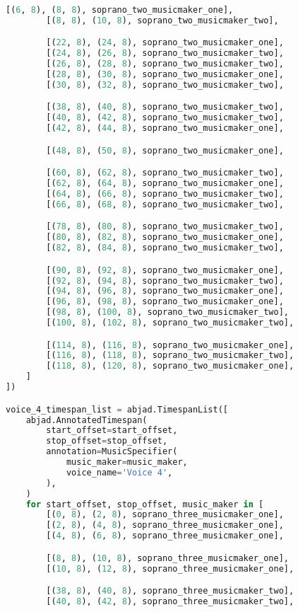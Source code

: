 \begin{lstlisting}[language=Python, caption=Invocation Source Code]
        [(6, 8), (8, 8), soprano_two_musicmaker_one],
        [(8, 8), (10, 8), soprano_two_musicmaker_two],

        [(22, 8), (24, 8), soprano_two_musicmaker_one],
        [(24, 8), (26, 8), soprano_two_musicmaker_two],
        [(26, 8), (28, 8), soprano_two_musicmaker_two],
        [(28, 8), (30, 8), soprano_two_musicmaker_one],
        [(30, 8), (32, 8), soprano_two_musicmaker_two],

        [(38, 8), (40, 8), soprano_two_musicmaker_two],
        [(40, 8), (42, 8), soprano_two_musicmaker_two],
        [(42, 8), (44, 8), soprano_two_musicmaker_one],

        [(48, 8), (50, 8), soprano_two_musicmaker_one],

        [(60, 8), (62, 8), soprano_two_musicmaker_two],
        [(62, 8), (64, 8), soprano_two_musicmaker_one],
        [(64, 8), (66, 8), soprano_two_musicmaker_two],
        [(66, 8), (68, 8), soprano_two_musicmaker_two],

        [(78, 8), (80, 8), soprano_two_musicmaker_two],
        [(80, 8), (82, 8), soprano_two_musicmaker_one],
        [(82, 8), (84, 8), soprano_two_musicmaker_two],

        [(90, 8), (92, 8), soprano_two_musicmaker_one],
        [(92, 8), (94, 8), soprano_two_musicmaker_two],
        [(94, 8), (96, 8), soprano_two_musicmaker_one],
        [(96, 8), (98, 8), soprano_two_musicmaker_one],
        [(98, 8), (100, 8), soprano_two_musicmaker_two],
        [(100, 8), (102, 8), soprano_two_musicmaker_two],

        [(114, 8), (116, 8), soprano_two_musicmaker_one],
        [(116, 8), (118, 8), soprano_two_musicmaker_two],
        [(118, 8), (120, 8), soprano_two_musicmaker_one],
    ]
])

voice_4_timespan_list = abjad.TimespanList([
    abjad.AnnotatedTimespan(
        start_offset=start_offset,
        stop_offset=stop_offset,
        annotation=MusicSpecifier(
            music_maker=music_maker,
            voice_name='Voice 4',
        ),
    )
    for start_offset, stop_offset, music_maker in [
        [(0, 8), (2, 8), soprano_three_musicmaker_one],
        [(2, 8), (4, 8), soprano_three_musicmaker_one],
        [(4, 8), (6, 8), soprano_three_musicmaker_one],

        [(8, 8), (10, 8), soprano_three_musicmaker_one],
        [(10, 8), (12, 8), soprano_three_musicmaker_one],

        [(38, 8), (40, 8), soprano_three_musicmaker_two],
        [(40, 8), (42, 8), soprano_three_musicmaker_two],


\end{lstlisting}
